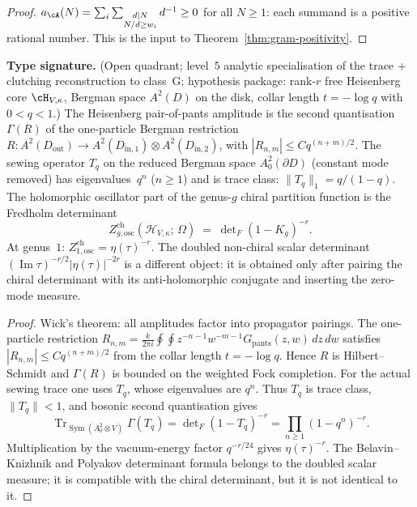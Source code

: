\begin{proof}
$a_\cA(N) = \sum_i\sum_{\substack{d \mid N \\ N/d \geq w_i}}
d^{-1} \geq 0$ for all $N \geq 1$: each summand is
a positive rational number. This is the input to
Theorem~\ref{thm:gram-positivity}.
\end{proof}

\begin{theorem}%
\label{thm:heisenberg-one-particle-sewing}%
%
%
%
\textbf{Type signature.} (Open quadrant; level~$5$ analytic
specialisation of the trace + clutching reconstruction to class~G;
hypothesis package: rank-$r$ free Heisenberg core $\cH_{V,\kappa}$,
Bergman space
$A^2(D)$ on the disk, collar length $t = -\log q$ with
$0 < q < 1$.)
The Heisenberg pair-of-pants amplitude is the second
quantisation $\Gamma(R)$ of the one-particle Bergman
restriction $R \colon A^2(D_{\mathrm{out}}) \to
A^2(D_{\mathrm{in},1}) \otimes A^2(D_{\mathrm{in},2})$,
with $|R_{n,m}| \leq Cq^{(n+m)/2}$.
The sewing operator $T_q$ on the reduced Bergman space
$A^2_0(\partial D)$ (constant mode removed) has
eigenvalues~$q^n$ ($n \geq 1$) and is trace class:
$\|T_q\|_1 = q/(1-q)$.
The holomorphic oscillator part of the genus-$g$ chiral partition
function is the Fredholm determinant
\begin{equation}\label{eq:heisenberg-fredholm}
Z_{g,\mathrm{osc}}^{\mathrm{ch}}(\mathcal{H}_{V,\kappa};\,\Omega)
\;=\;
\det\nolimits_F(1-K_g)^{-r}.
\end{equation}
At genus~$1$:
$
Z_{1,\mathrm{osc}}^{\mathrm{ch}}=\eta(\tau)^{-r}.
$
The doubled non-chiral scalar determinant
$(\operatorname{Im}\tau)^{-r/2}|\eta(\tau)|^{-2r}$ is a different
object: it is obtained only after pairing the chiral determinant with
its anti-holomorphic conjugate and inserting the zero-mode measure.
\end{theorem}

\begin{proof}
Wick's theorem: all amplitudes factor into propagator pairings.
The one-particle restriction
$R_{n,m} = \frac{k}{2\pi i}\oint\oint z^{-n-1}w^{-m-1}
G_{\mathrm{pants}}(z,w)\,dz\,dw$
satisfies $|R_{n,m}| \leq Cq^{(n+m)/2}$ from the collar length
$t = -\log q$. Hence $R$ is Hilbert--Schmidt and $\Gamma(R)$
is bounded on the weighted Fock completion. For the actual sewing
trace one uses $T_q$, whose eigenvalues are $q^n$. Thus $T_q$ is trace
class, $\|T_q\|<1$, and bosonic second quantisation gives
\[
\operatorname{Tr}_{\operatorname{Sym}(A^2_0\otimes V)}\Gamma(T_q)
=\det\nolimits_F(1-T_q)^{-r}
=\prod_{n\ge1}(1-q^n)^{-r}.
\]
Multiplication by the vacuum-energy factor $q^{-r/24}$ gives
$\eta(\tau)^{-r}$. The Belavin--Knizhnik and Polyakov determinant
formula belongs to the doubled scalar measure; it is compatible with
the chiral determinant, but it is not identical to it.
\end{proof}


